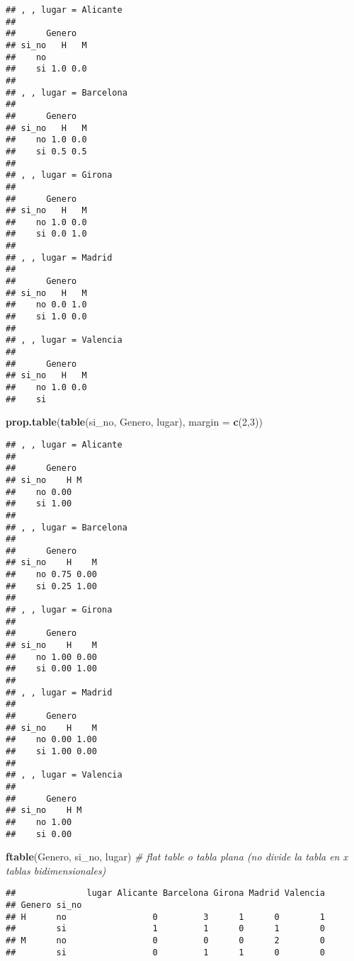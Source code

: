 \documentclass[]{article}
\newenvironment{Shaded}{\begin{snugshade}}{\end{snugshade}}
\newcommand{\CommentTok}[1]{\textcolor[rgb]{0.56,0.35,0.01}{\textit{#1}}}
\newcommand{\DataTypeTok}[1]{\textcolor[rgb]{0.13,0.29,0.53}{#1}}
\newcommand{\DecValTok}[1]{\textcolor[rgb]{0.00,0.00,0.81}{#1}}
\newcommand{\KeywordTok}[1]{\textcolor[rgb]{0.13,0.29,0.53}{\textbf{#1}}}
\newcommand{\NormalTok}[1]{#1}
\begin{document}
\begin{verbatim}
## , , lugar = Alicante
## 
##      Genero
## si_no   H   M
##    no        
##    si 1.0 0.0
## 
## , , lugar = Barcelona
## 
##      Genero
## si_no   H   M
##    no 1.0 0.0
##    si 0.5 0.5
## 
## , , lugar = Girona
## 
##      Genero
## si_no   H   M
##    no 1.0 0.0
##    si 0.0 1.0
## 
## , , lugar = Madrid
## 
##      Genero
## si_no   H   M
##    no 0.0 1.0
##    si 1.0 0.0
## 
## , , lugar = Valencia
## 
##      Genero
## si_no   H   M
##    no 1.0 0.0
##    si
\end{verbatim}

\begin{Shaded}
\begin{Highlighting}[]
\KeywordTok{prop.table}\NormalTok{(}\KeywordTok{table}\NormalTok{(si_no, Genero, lugar), }\DataTypeTok{margin =} \KeywordTok{c}\NormalTok{(}\DecValTok{2}\NormalTok{,}\DecValTok{3}\NormalTok{))}
\end{Highlighting}
\end{Shaded}

\begin{verbatim}
## , , lugar = Alicante
## 
##      Genero
## si_no    H M
##    no 0.00  
##    si 1.00  
## 
## , , lugar = Barcelona
## 
##      Genero
## si_no    H    M
##    no 0.75 0.00
##    si 0.25 1.00
## 
## , , lugar = Girona
## 
##      Genero
## si_no    H    M
##    no 1.00 0.00
##    si 0.00 1.00
## 
## , , lugar = Madrid
## 
##      Genero
## si_no    H    M
##    no 0.00 1.00
##    si 1.00 0.00
## 
## , , lugar = Valencia
## 
##      Genero
## si_no    H M
##    no 1.00  
##    si 0.00
\end{verbatim}

\begin{Shaded}
\begin{Highlighting}[]
\KeywordTok{ftable}\NormalTok{(Genero, si_no, lugar) }\CommentTok{# flat table o tabla plana (no divide la tabla en x tablas bidimensionales)}
\end{Highlighting}
\end{Shaded}

\begin{verbatim}
##              lugar Alicante Barcelona Girona Madrid Valencia
## Genero si_no                                                
## H      no                 0         3      1      0        1
##        si                 1         1      0      1        0
## M      no                 0         0      0      2        0
##        si                 0         1      1      0        0
\end{verbatim}
\end{document}
